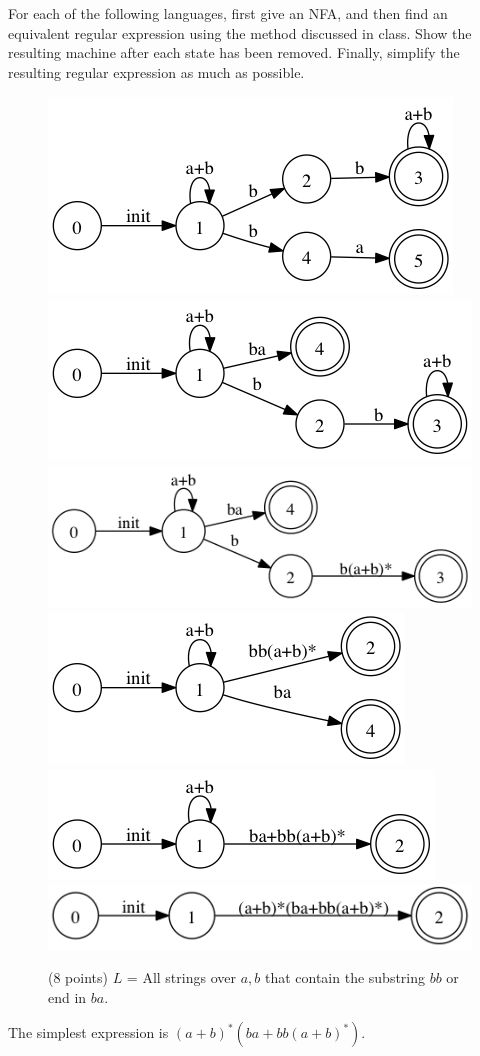 \documentclass[paper=a4, fontsize=11pt]{scrartcl} %
\begin{document}
\maketitle %

\section{}

\begin{fancyquotes}
  For each of the following languages, first give an NFA, and then
  find an equivalent regular expression using the method discussed in
  class. Show the resulting machine after each state has been
  removed. Finally, simplify the resulting regular expression as much
  as possible.
\end{fancyquotes}

\begin{figure}[hp]
  \centering
  \includegraphics[width=.4\textwidth]{1-1.gv.png}
  \includegraphics[width=.4\textwidth]{1-1.gv.2.png}
  \includegraphics[width=.4\textwidth]{1-1.gv.3.png}
  \includegraphics[width=.4\textwidth]{1-1.gv.4.png}
  \includegraphics[width=.4\textwidth]{1-1.gv.5.png}
  \includegraphics[width=.4\textwidth]{1-1.gv.6.png}
  \caption{(8 points) $L$ = All strings over ${a,b}$ that contain the substring $bb$ or end in $ba$.}
\end{figure}
The simplest expression is $(a+b)^*(ba+bb(a+b)^*)$.
\end{document}
